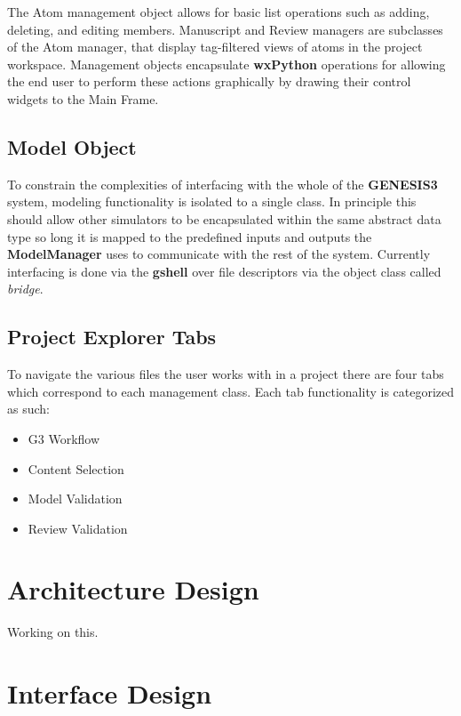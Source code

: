 \documentclass[12pt]{article}
\begin{document}
The Atom management object allows for basic list operations such as adding, deleting, and editing members. Manuscript and Review managers are subclasses of the Atom manager, that display tag-filtered views of atoms in the project workspace. Management objects encapsulate {\bf wxPython} operations for allowing the end user to perform these actions graphically by drawing their control widgets to the Main Frame. 

\subsection*{Model Object}

	To constrain the complexities of interfacing with the whole of the {\bf GENESIS3} system, modeling functionality is isolated to a single class. In principle this should allow other simulators to be encapsulated within the same abstract data type so long it is mapped to the predefined inputs and outputs the {\bf ModelManager} uses to communicate with the rest of the system.
	Currently interfacing is done via the {\bf gshell} over file descriptors via the object class called {\it bridge}. 
	
\subsection*{Project Explorer Tabs}

	To navigate the various files the user works with in a project there are four tabs which correspond to each management class. Each tab functionality is categorized as such:
	
\begin{itemize}
\item[] G3 Workflow
\item[] Content Selection
\item[] Model Validation
\item[] Review Validation
\end{itemize}


\section*{Architecture Design}

Working on this.


\section*{Interface Design}
\end{document}
